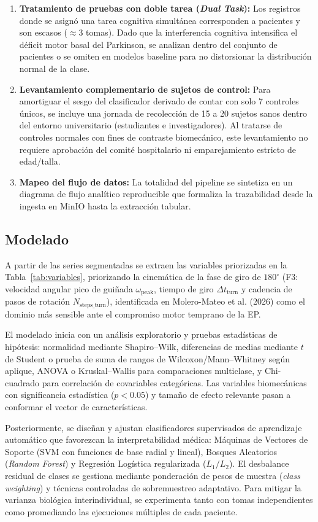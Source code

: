 \documentclass[12pt,a4paper]{article}
\begin{document}
\begin{enumerate}[itemsep=3pt]
  \item \textbf{Tratamiento de pruebas con doble tarea (\emph{Dual Task}):} Los registros donde se asignó una tarea cognitiva simultánea corresponden a pacientes y son escasos ($\approx$3 tomas). Dado que la interferencia cognitiva intensifica el déficit motor basal del Parkinson, se analizan dentro del conjunto de pacientes o se omiten en modelos baseline para no distorsionar la distribución normal de la clase.
  \item \textbf{Levantamiento complementario de sujetos de control:} Para amortiguar el sesgo del clasificador derivado de contar con solo 7 controles únicos, se incluye una jornada de recolección de 15 a 20 sujetos sanos dentro del entorno universitario (estudiantes e investigadores). Al tratarse de controles normales con fines de contraste biomecánico, este levantamiento no requiere aprobación del comité hospitalario ni emparejamiento estricto de edad/talla.
  \item \textbf{Mapeo del flujo de datos:} La totalidad del pipeline se sintetiza en un diagrama de flujo analítico reproducible que formaliza la trazabilidad desde la ingesta en MinIO hasta la extracción tabular.
\end{enumerate}

\subsection{Modelado}\label{sec:met-modelado}

A partir de las series segmentadas se extraen las variables priorizadas en la Tabla~\ref{tab:variables}, priorizando la cinemática de la fase de giro de $180^\circ$ (F3: velocidad angular pico de guiñada $\omega_{\text{peak}}$, tiempo de giro $\Delta t_{\text{turn}}$ y cadencia de pasos de rotación $N_{\text{steps\_turn}}$), identificada en Molero-Mateo et al. (2026) como el dominio más sensible ante el compromiso motor temprano de la EP.

El modelado inicia con un análisis exploratorio y pruebas estadísticas de hipótesis: normalidad mediante Shapiro--Wilk, diferencias de medias mediante $t$ de Student o prueba de suma de rangos de Wilcoxon/Mann--Whitney según aplique, ANOVA o Kruskal--Wallis para comparaciones multiclase, y Chi-cuadrado para correlación de covariables categóricas. Las variables biomecánicas con significancia estadística ($p < 0.05$) y tamaño de efecto relevante pasan a conformar el vector de características.

Posteriormente, se diseñan y ajustan clasificadores supervisados de aprendizaje automático que favorezcan la interpretabilidad médica: Máquinas de Vectores de Soporte (SVM con funciones de base radial y lineal), Bosques Aleatorios (\emph{Random Forest}) y Regresión Logística regularizada ($L_1/L_2$). El desbalance residual de clases se gestiona mediante ponderación de pesos de muestra (\emph{class weighting}) y técnicas controladas de sobremuestreo adaptativo. Para mitigar la varianza biológica interindividual, se experimenta tanto con tomas independientes como promediando las ejecuciones múltiples de cada paciente.
\end{document}
